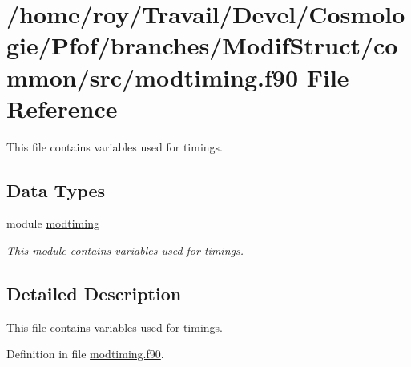 \hypertarget{modtiming_8f90}{\section{/home/roy/\-Travail/\-Devel/\-Cosmologie/\-Pfof/branches/\-Modif\-Struct/common/src/modtiming.f90 File Reference}
\label{modtiming_8f90}
}


This file contains variables used for timings.  


\subsection*{Data Types}
\begin{DoxyCompactItemize}
\item 
module \hyperlink{classmodtiming}{modtiming}
\begin{DoxyCompactList}\small\item\em This module contains variables used for timings. \end{DoxyCompactList}\end{DoxyCompactItemize}


\subsection{Detailed Description}
This file contains variables used for timings. 

Definition in file \hyperlink{modtiming_8f90_source}{modtiming.\-f90}.

